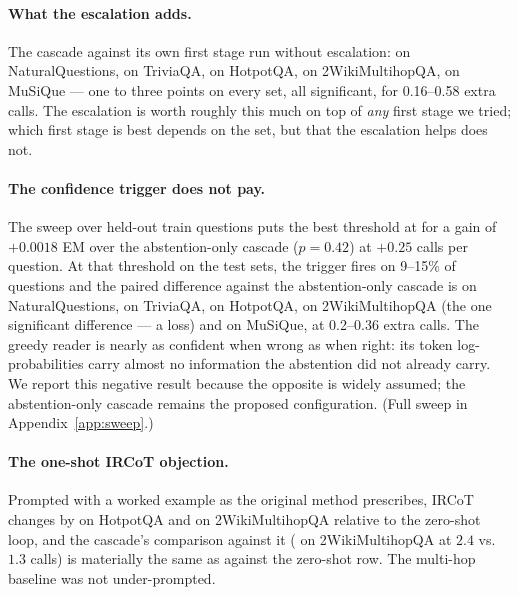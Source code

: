 \paragraph{What the escalation adds.} The cascade against its own first
stage run without escalation: \FusedVsCascadeNQExactMatchDiff{} on
NaturalQuestions, \FusedVsCascadeTriviaQAExactMatchDiff{} on TriviaQA,
\FusedVsCascadeHotpotQAExactMatchDiff{} on HotpotQA,
\FusedVsCascadeTwoWikiExactMatchDiff{} on 2WikiMultihopQA,
\FusedVsCascadeMuSiQueExactMatchDiff{} on MuSiQue --- one to three points
on every set, all significant, for 0.16--0.58 extra calls. The escalation
is worth roughly this much on top of \emph{any} first stage we tried;
which first stage is best depends on the set, but that the escalation
helps does not.

\paragraph{The confidence trigger does not pay.} The sweep over
\SweepQuestions{} held-out train questions puts the best threshold at
\SweepBestThreshold{} for a gain of $+0.0018$ EM over the abstention-only
cascade ($p=0.42$) at $+0.25$ calls per question. At that threshold on the
test sets, the trigger fires on 9--15\% of questions and the paired
difference against the abstention-only cascade is
\CascadeVsCascadeLogprobNQExactMatchDiff{} on NaturalQuestions,
\CascadeVsCascadeLogprobTriviaQAExactMatchDiff{} on TriviaQA,
\CascadeVsCascadeLogprobHotpotQAExactMatchDiff{} on HotpotQA,
\CascadeVsCascadeLogprobTwoWikiExactMatchDiff{} on 2WikiMultihopQA (the
one significant difference --- a loss) and
\CascadeVsCascadeLogprobMuSiQueExactMatchDiff{} on MuSiQue, at 0.2--0.36
extra calls. The greedy reader is nearly as confident when wrong as when
right: its token log-probabilities carry almost no information the
abstention did not already carry. We report this negative result because
the opposite is widely assumed; the abstention-only cascade remains the
proposed configuration. (Full sweep in Appendix~\ref{app:sweep}.)

\paragraph{The one-shot IRCoT objection.} Prompted with a worked example
as the original method prescribes, IRCoT changes by
\IRCoTVsIRCoTOneShotHotpotQAExactMatchDiff{} on HotpotQA and
\IRCoTVsIRCoTOneShotTwoWikiExactMatchDiff{} on 2WikiMultihopQA relative
to the zero-shot loop, and the cascade's comparison against it
(\IRCoTOneShotVsCascadeTwoWikiExactMatchDiff{} on 2WikiMultihopQA at
$2.4$ vs.\ $1.3$ calls) is materially the same as against the zero-shot
row. The multi-hop baseline was not under-prompted.

